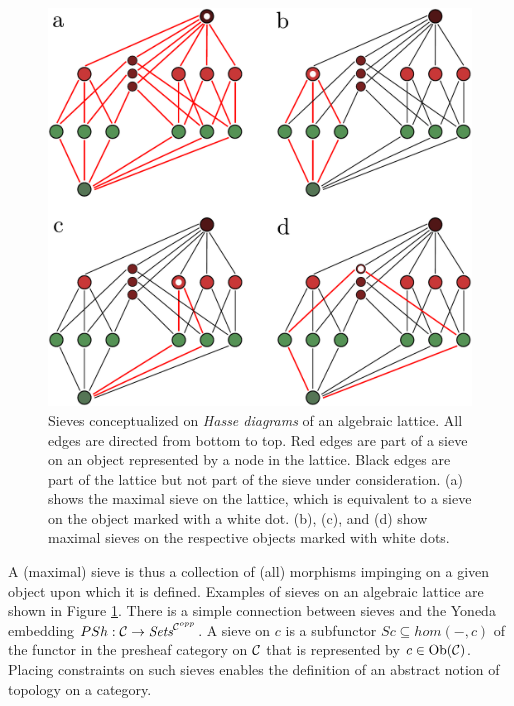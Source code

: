 \documentclass[aps,twocolumn]{revtex4-1}
\begin{document}
\begin{figure}
\noindent\includegraphics[width=1.0\columnwidth]{fig/sieveHasseNoNum.pdf}
\caption{Sieves conceptualized on {\it Hasse diagrams} of an algebraic lattice. All edges are directed from bottom to top. Red edges are part of a sieve on an object represented by a node in the lattice. Black edges are part of the lattice but not part of the sieve under consideration. (a) shows the maximal sieve on the lattice, which is equivalent to a sieve on the object marked with a white dot. (b), (c), and (d) show maximal sieves on the respective objects marked with white dots.}
\label{fig:sieve}
\end{figure}

A (maximal) sieve is thus a collection of (all) morphisms impinging on a given object upon which it is defined. Examples of sieves on an algebraic lattice are shown in Figure \ref{fig:sieve}. There is a simple connection between sieves and the Yoneda embedding $PSh:{\mathcal C} \rightarrow \textit{Sets}^{{\mathcal C}^{opp}}$. A sieve on $c$ is a subfunctor $Sc \subseteq hom(-,c)$ of the functor in the presheaf category on ${\mathcal C}$ that is represented by $c \in \mathop{\rm Ob}\nolimits({\mathcal C})$. Placing constraints on such sieves enables the definition of an abstract notion of topology on a category.
\end{document}
